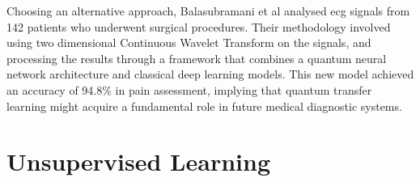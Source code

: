 Choosing an alternative approach, Balasubramani et al \cite{Balasubramani2025} analysed \ac{ecg} signals from 142 patients who underwent surgical procedures. Their methodology involved using two dimensional Continuous Wavelet Transform on the signals, and processing the results through a framework that combines a quantum neural network architecture and classical deep learning models. This new model achieved an accuracy of 94.8\% in pain assessment, implying that quantum transfer learning might acquire a fundamental role in future medical diagnostic systems. 



\section{Unsupervised Learning}



